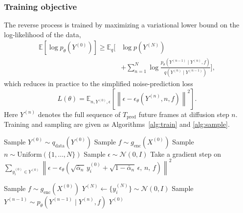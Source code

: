 \documentclass[lettersize,journal]{IEEEtran}
\begin{document}
\subsubsection{\textbf{Training objective}}
The reverse process is trained by maximizing a variational lower bound
on the log-likelihood of the data,
\begin{align}
\mathbb{E}\!\left[\log p_\theta\!\left(Y^{(0)}\right)\right] \geq
\mathbb{E}_q\Bigg[ &\log p\!\left(Y^{(N)}\right) \nonumber\\
&+ \sum_{n=1}^{N} \log
\frac{p_\theta\!\left(Y^{(n-1)} \mid Y^{(n)}, f\right)}
{q\!\left(Y^{(n)} \mid Y^{(n-1)}\right)} \Bigg],
\label{eq:vlb}
\end{align}
which reduces in practice to the simplified noise-prediction loss
\begin{equation}
L(\theta) = \mathbb{E}_{n, Y^{(0)}, \epsilon}
\left[\left\| \epsilon - \epsilon_\theta\!\left(Y^{(n)}, n, f\right)
\right\|^2\right].
\label{eq:simple_loss}
\end{equation}
Here $Y^{(n)}$ denotes the full sequence of $T_{\mathrm{pred}}$ future
frames at diffusion step $n$. Training and sampling are given as
Algorithms~\ref{alg:train} and \ref{alg:sample}.

\begin{algorithm}[!t]
\caption{Training the conditional diffusion model}
\label{alg:train}
\begin{algorithmic}[1]
\REPEAT
\STATE Sample $Y^{(0)} \sim q_{\mathrm{data}}\!\left(Y^{(0)}\right)$
\STATE Sample $f \sim g_{\mathrm{enc}}\!\left(X^{(0)}\right)$
\STATE Sample $n \sim \mathrm{Uniform}(\{1,\ldots,N\})$
\STATE Sample $\epsilon \sim \mathcal{N}(0, I)$
\STATE Take a gradient step on
$\sum_{y^{(0)}_i \in Y^{(0)}}
\left\| \epsilon - \epsilon_\theta\!\left(
\sqrt{\bar\alpha_n}\, y^{(0)}_i + \sqrt{1-\bar\alpha_n}\,\epsilon,\,
n,\, f\right)\right\|^2$
\end{algorithmic}
\end{algorithm}

\begin{algorithm}[!t]
\caption{Sampling a future waveform}
\label{alg:sample}
\begin{algorithmic}[1]
\STATE Sample $f \sim g_{\mathrm{enc}}\!\left(X^{(0)}\right)$
\STATE $Y^{(N)} \leftarrow \{y^{(N)}_i\} \sim \mathcal{N}(0, I)$
\STATE Sample $Y^{(n-1)} \sim
p_\theta\!\left(Y^{(n-1)} \mid Y^{(n)}, f\right)$
\ENDFOR
\RETURN $Y^{(0)}$
\end{algorithmic}
\end{algorithm}
\end{document}
